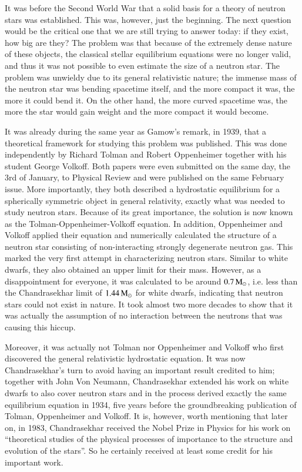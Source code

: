 It was before the Second World War that a solid basis for a theory of neutron stars was established.
This was, however, just the beginning. 
The next question would be the critical one that we are still trying to answer today:
if they exist, how big are they?
The problem was that because of the extremely dense nature of these objects, the classical stellar equilibrium equations were no longer valid, and thus it was not possible to even estimate the size of a neutron star.
The problem was unwieldy due to its general relativistic nature;
the immense mass of the neutron star was bending spacetime itself, and the more compact it was, the more it could bend it. 
On the other hand, the more curved spacetime was, the more the star would gain weight and the more compact it would become.

It was already during the same year as Gamow's remark, in 1939, that a theoretical framework for studying this problem was published.
This was done independently by Richard Tolman\cite{Tolman39} and Robert Oppenheimer together with his student George Volkoff\cite{OV39}.
Both papers were even submitted on the same day, the 3rd of January, to Physical Review and were published on the same February issue.
More importantly, they both described a hydrostatic equilibrium for a spherically symmetric object in general relativity, exactly what was needed to study neutron stars.
Because of its great importance, the solution is now known as the Tolman-Oppenheimer-Volkoff equation.
In addition, Oppenheimer and Volkoff applied their equation and numerically calculated the structure of a neutron star consisting of non-interacting strongly degenerate neutron gas.
This marked the very first attempt in characterizing neutron stars.
Similar to white dwarfs, they also obtained an upper limit for their mass. 
However, as a disappointment for everyone, it was calculated to be around $0.7\, \mathrm{M}_{\odot}$, i.e. less than the Chandrasekhar limit of $1.44\, \mathrm{M}_{\odot}$ for white dwarfs, indicating that neutron stars could not exist in nature.
It took almost two more decades to show that it was actually the assumption of no interaction between the neutrons that was causing this hiccup.

Moreover, it was actually not Tolman nor Oppenheimer and Volkoff who first discovered the general relativistic hydrostatic equation.
It was now Chandrasekhar's turn to avoid having an important result credited to him;
together with John Von Neumann, Chandrasekhar extended his work on white dwarfs to also cover neutron stars and in the process derived exactly the same equilibrium equation in 1934, five years before the groundbreaking publication of Tolman, Oppenheimer and Volkoff.\cite{Baym82}
It is, however, worth mentioning that later on, in 1983, Chandrasekhar received the Nobel Prize in Physics for his work on ``theoretical studies of the physical processes of importance to the structure and evolution of the stars''.
So he certainly received at least some credit for his important work.

